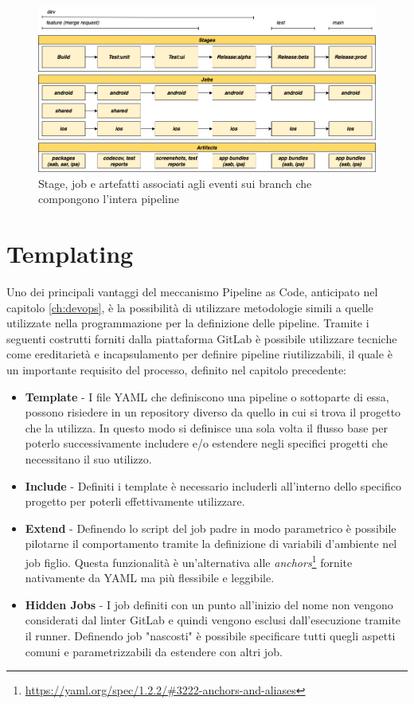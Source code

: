 \begin{figure}[H]
    \centering
    \includegraphics[width=1\textwidth]{img/cicd-branch-jobs.png}
    \caption{Stage, job e artefatti associati agli eventi sui branch che compongono l'intera pipeline}
    \label{pipeline-branches}
\end{figure}

\section{Templating}
Uno dei principali vantaggi del meccanismo Pipeline as Code, 
anticipato nel capitolo \ref{ch:devops}, 
è la possibilità di utilizzare metodologie simili a quelle utilizzate nella programmazione per la definizione delle pipeline. 
Tramite i seguenti costrutti forniti dalla piattaforma GitLab è possibile utilizzare tecniche come ereditarietà e incapsulamento per definire pipeline riutilizzabili, 
il quale è un importante requisito del processo, 
definito nel capitolo precedente:

\begin{itemize}
    \item \textbf{Template} - I file YAML che definiscono una pipeline o sottoparte di essa, possono risiedere in un repository diverso da quello in cui si trova il progetto che la utilizza. In questo modo si definisce una sola volta il flusso base per poterlo successivamente includere e/o estendere negli specifici progetti che necessitano il suo utilizzo.
    
    \item \textbf{Include} - Definiti i template è necessario includerli all'interno dello specifico progetto per poterli effettivamente utilizzare.
    
    \item \textbf{Extend} - Definendo lo script del job padre in modo parametrico è possibile pilotarne il comportamento tramite la definizione di variabili d'ambiente nel job figlio. Questa funzionalità è un'alternativa alle \textit{anchors}\footnote{\href{https://yaml.org/spec/1.2.2/\#3222-anchors-and-aliases}{https://yaml.org/spec/1.2.2/\#3222-anchors-and-aliases}} fornite nativamente da YAML ma più flessibile e leggibile.
    
    \item \textbf{Hidden Jobs} - I job definiti con un punto all'inizio del nome non vengono considerati dal linter GitLab e quindi vengono esclusi dall'esecuzione tramite il runner. Definendo job "nascosti" è possibile specificare tutti quegli aspetti comuni e parametrizzabili da estendere con altri job.
\end{itemize}


